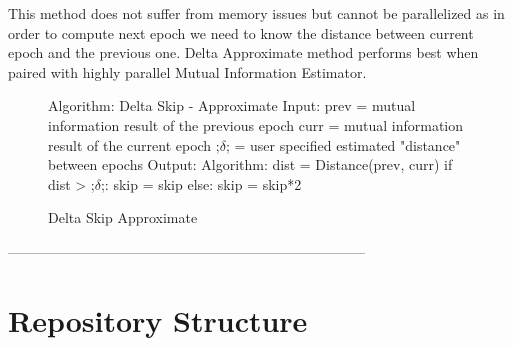 \documentclass[dissertation.tex]{subfiles}
\begin{document}
  This method does not suffer from memory issues but cannot be parallelized as
  in order to compute next epoch we need to know the distance between current
  epoch and the previous one. Delta Approximate method performs best when paired
  with highly parallel Mutual Information Estimator.

\begin{figure}[H]
    \begin{pythonfigure}
      Algorithm: Delta Skip - Approximate
      Input:
      prev = mutual information result of the previous epoch
      curr = mutual information result of the current epoch
      ;$\delta$; = user specified estimated "distance" between epochs
      Output:
      Algorithm:
      dist = Distance(prev, curr)
      if dist > ;$\delta$;:
        skip = skip
      else:
        skip = skip*2
    \end{pythonfigure}
    \caption{Delta Skip Approximate}
    \label{fig:deltaapprox}
\end{figure}

-----------------------------------------------------------------------------

\section{Repository Structure}
\end{document}
